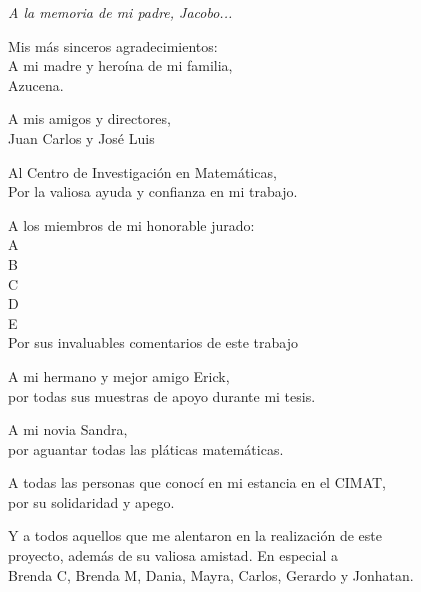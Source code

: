 \thispagestyle{empty}
\begin{flushright}
\textit{A la memoria de mi padre, Jacobo...}
\end{flushright}

\newpage

\thispagestyle{empty}
\begin{flushright}

\flushright Mis más sinceros agradecimientos: \\

\flushright A mi madre y heroína de mi familia, \\ Azucena.

\flushright A mis amigos y directores, \\ Juan Carlos y José Luis

\flushright Al Centro de Investigación en Matemáticas, \\ Por la valiosa ayuda y confianza en mi trabajo.

\flushright A los miembros de mi honorable jurado: \\ A \\ B \\ C \\ D \\ E \\ Por sus invaluables comentarios de este trabajo

\flushright A mi hermano y mejor amigo Erick, \\ por todas sus muestras de apoyo durante mi tesis.

\flushright A mi novia Sandra, \\ por aguantar todas las pláticas matemáticas.

\flushright A todas las personas que conocí en mi estancia en el CIMAT, \\ por su solidaridad y apego.

\flushright Y a todos aquellos que me alentaron en la realización de este \\ proyecto, además de su valiosa amistad. En especial a \\ Brenda C, Brenda M, Dania, Mayra, Carlos, Gerardo y Jonhatan.

\end{flushright}